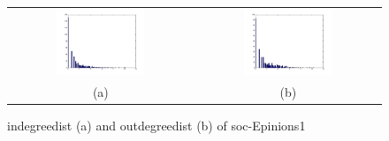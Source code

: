 \begin{figure}[htbf]
\begin{center}
\begin{tabular}{cc}
     \includegraphics[width=0.5\textwidth]{FIG/soc_result/indegreedist.png} &
     \includegraphics[width=0.5\textwidth]{FIG/soc_result/outdegreedist.png} \\
    (a) & (b) 
\end{tabular}
\caption{ indegreedist (a) and outdegreedist (b) of soc-Epinions1}
\label{fig:results}
\end{center}
\end{figure}

